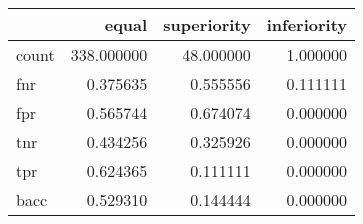 \begin{tabular}{lrrr}
\toprule
{} &       equal &  superiority &  inferiority \\
\midrule
count &  338.000000 &    48.000000 &     1.000000 \\
fnr   &    0.375635 &     0.555556 &     0.111111 \\
fpr   &    0.565744 &     0.674074 &     0.000000 \\
tnr   &    0.434256 &     0.325926 &     0.000000 \\
tpr   &    0.624365 &     0.111111 &     0.000000 \\
bacc  &    0.529310 &     0.144444 &     0.000000 \\
\bottomrule
\end{tabular}
